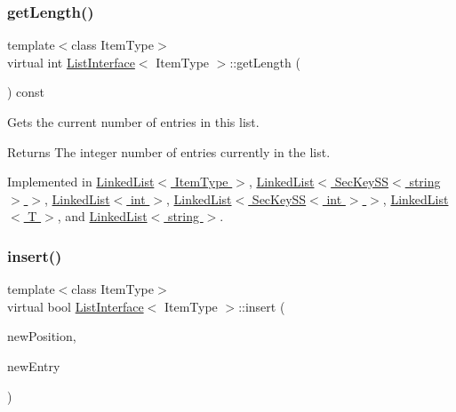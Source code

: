 \mbox{\label{classListInterface_afc85695d4137f1e29ff02e179c9f3221}} 
\subsubsection{\texorpdfstring{get\+Length()}{getLength()}}
{\footnotesize\ttfamily template$<$class Item\+Type$>$ \\
virtual int \hyperlink{classListInterface}{List\+Interface}$<$ Item\+Type $>$\+::get\+Length (\begin{DoxyParamCaption}{ }\end{DoxyParamCaption}) const\hspace{0.3cm}{\ttfamily [pure virtual]}}

Gets the current number of entries in this list. \begin{DoxyReturn}{Returns}
The integer number of entries currently in the list. 
\end{DoxyReturn}


Implemented in \hyperlink{classLinkedList_a61d045ef6008b494a1a516ecc992c0e7}{Linked\+List$<$ Item\+Type $>$}, \hyperlink{classLinkedList_a61d045ef6008b494a1a516ecc992c0e7}{Linked\+List$<$ Sec\+Key\+S\+S$<$ string $>$ $>$}, \hyperlink{classLinkedList_a61d045ef6008b494a1a516ecc992c0e7}{Linked\+List$<$ int $>$}, \hyperlink{classLinkedList_a61d045ef6008b494a1a516ecc992c0e7}{Linked\+List$<$ Sec\+Key\+S\+S$<$ int $>$ $>$}, \hyperlink{classLinkedList_a61d045ef6008b494a1a516ecc992c0e7}{Linked\+List$<$ T $>$}, and \hyperlink{classLinkedList_a61d045ef6008b494a1a516ecc992c0e7}{Linked\+List$<$ string $>$}.

\mbox{\label{classListInterface_a5b2f86954a86172699a3495982c38e77}} 
\subsubsection{\texorpdfstring{insert()}{insert()}}
{\footnotesize\ttfamily template$<$class Item\+Type$>$ \\
virtual bool \hyperlink{classListInterface}{List\+Interface}$<$ Item\+Type $>$\+::insert (\begin{DoxyParamCaption}\item[{int}]{new\+Position,  }\item[{const Item\+Type \&}]{new\+Entry }\end{DoxyParamCaption})\hspace{0.3cm}{\ttfamily [pure virtual]}}

